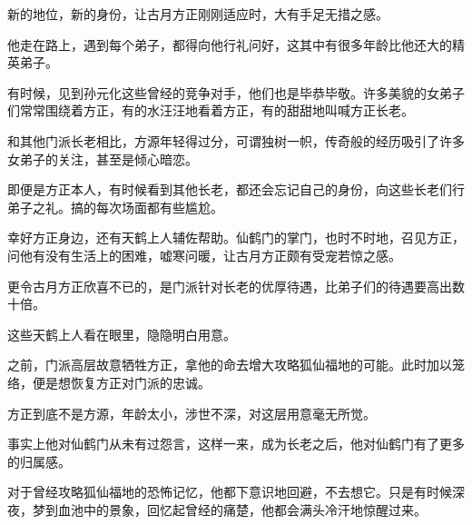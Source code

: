 \begin{this_body}
新的地位，新的身份，让古月方正刚刚适应时，大有手足无措之感。

他走在路上，遇到每个弟子，都得向他行礼问好，这其中有很多年龄比他还大的精英弟子。

有时候，见到孙元化这些曾经的竞争对手，他们也是毕恭毕敬。许多美貌的女弟子们常常围绕着方正，有的水汪汪地看着方正，有的甜甜地叫喊方正长老。

和其他门派长老相比，方源年轻得过分，可谓独树一帜，传奇般的经历吸引了许多女弟子的关注，甚至是倾心暗恋。

即便是方正本人，有时候看到其他长老，都还会忘记自己的身份，向这些长老们行弟子之礼。搞的每次场面都有些尴尬。

幸好方正身边，还有天鹤上人辅佐帮助。仙鹤门的掌门，也时不时地，召见方正，问他有没有生活上的困难，嘘寒问暖，让古月方正颇有受宠若惊之感。

更令古月方正欣喜不已的，是门派针对长老的优厚待遇，比弟子们的待遇要高出数十倍。

这些天鹤上人看在眼里，隐隐明白用意。

之前，门派高层故意牺牲方正，拿他的命去增大攻略狐仙福地的可能。此时加以笼络，便是想恢复方正对门派的忠诚。

方正到底不是方源，年龄太小，涉世不深，对这层用意毫无所觉。

事实上他对仙鹤门从未有过怨言，这样一来，成为长老之后，他对仙鹤门有了更多的归属感。

对于曾经攻略狐仙福地的恐怖记忆，他都下意识地回避，不去想它。只是有时候深夜，梦到血池中的景象，回忆起曾经的痛楚，他都会满头冷汗地惊醒过来。

\end{this_body}

